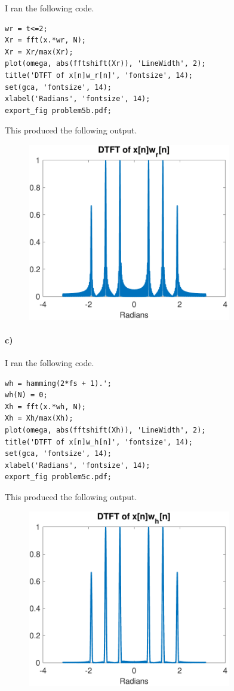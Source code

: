\documentclass[12pt]{article}
\begin{document}
I ran the following code.
\begin{verbatim}
wr = t<=2;
Xr = fft(x.*wr, N);
Xr = Xr/max(Xr);
plot(omega, abs(fftshift(Xr)), 'LineWidth', 2);
title('DTFT of x[n]w_r[n]', 'fontsize', 14);
set(gca, 'fontsize', 14);
xlabel('Radians', 'fontsize', 14);
export_fig problem5b.pdf;
\end{verbatim}
This produced the following output.
\begin{figure}[H]
    \begin{center}
        \includegraphics[width=3.5in]{problem5b.pdf}
    \end{center}
\end{figure}

\paragraph{c)}

I ran the following code.
\begin{verbatim}
wh = hamming(2*fs + 1).';
wh(N) = 0;
Xh = fft(x.*wh, N);
Xh = Xh/max(Xh);
plot(omega, abs(fftshift(Xh)), 'LineWidth', 2);
title('DTFT of x[n]w_h[n]', 'fontsize', 14);
set(gca, 'fontsize', 14);
xlabel('Radians', 'fontsize', 14);
export_fig problem5c.pdf;
\end{verbatim}
This produced the following output.
\begin{figure}[H]
    \begin{center}
        \includegraphics[width=3.5in]{problem5c.pdf}
    \end{center}
\end{figure}
\end{document}

